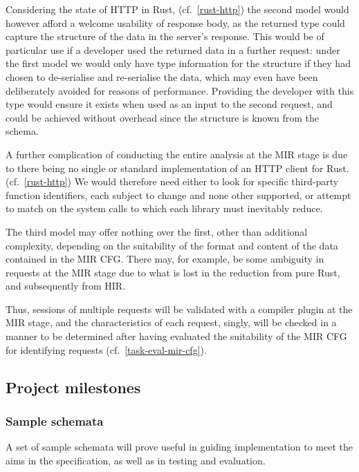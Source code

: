 Considering the state of HTTP in Rust, (cf.~\ref{rust-http}) the second model would however afford a welcome usability of response body, as the returned type could capture the structure of the data in the server's response. This would be of particular use if a developer used the returned data in a further request: under the first model we would only have type information for the structure if they had chosen to de-serialise and re-serialise the data, which may even have been deliberately avoided  for reasons of performance. Providing the developer with this type would ensure it exists when used as an input to the second request, and could be achieved without overhead since the structure is known from the schema.

A further complication of conducting the entire analysis at the MIR stage is due to there being no single or standard implementation of an HTTP client for Rust. (cf.~\ref{rust-http}) We would therefore need either to look for specific third-party function identifiers, each subject to change and none other supported, or attempt to match on the system calls to which each library must inevitably reduce.

The third model may offer nothing over the first, other than additional complexity, depending on the suitability of the format and content of the data contained in the MIR CFG. There may, for example, be some ambiguity in requests at the MIR stage due to what is lost in the reduction from pure Rust, and subsequently from HIR.

Thus, sessions of multiple requests will be validated with a compiler plugin at the MIR stage, and the characteristics of each request, singly, will be checked in a manner to be determined after having evaluated the suitability of the MIR CFG for identifying requests (cf.~\ref{task-eval-mir-cfg}).\label{proposal-validation}

\subsection{Project milestones}\label{tasks}

\subsubsection{Sample schemata}\label{task-sample-schemata}
A set of sample schemata will prove useful in guiding implementation to meet the aims in the specification, as well as in testing and evaluation.
\begin{task}
\end{task}

